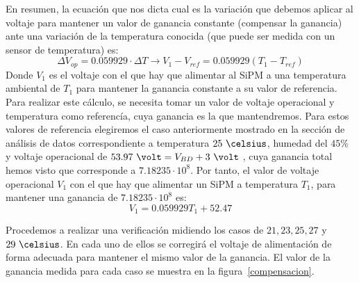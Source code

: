 En resumen, la ecuación que nos dicta cual es la variación que debemos aplicar al voltaje para mantener un valor de ganancia constante (compensar la ganancia) ante una variación de la temperatura conocida (que puede ser medida con un sensor de temperatura) es:
\begin{equation}
\Delta V_{op}=0.059929 \cdot \Delta T \longrightarrow V_1-V_{ref}=0.059929(T_1-T_{ref})
\label{compensacionfinal}
\end{equation}
Donde $V_1$ es el voltaje con el que hay que alimentar al SiPM a una temperatura ambiental de $T_1$ para mantener la ganancia constante a su valor de referencia. Para realizar este cálculo, se necesita tomar un valor de voltaje operacional y temperatura como referencía, cuya ganancia es la que mantendremos. Para estos valores de referencia elegiremos el caso anteriormente mostrado en la sección de análisis de datos correspondiente a temperatura $25~\celsius$, humedad del $45\% $ y voltaje operacional de $53.97~\volt = V_{BD}+ 3~\volt$ , cuya ganancia total hemos visto que corresponde a $7.18235 \cdot 10^8$. Por tanto, el valor de voltaje operacional $V_1$ con el que hay que alimentar un SiPM a temperatura $T_1$, para mantener una ganancia de $7.18235 \cdot 10^8$ es:
\begin{equation}
V_1=0.059929T_1+52.47
\label{compensacionfinal}
\end{equation}




Procedemos a realizar una verificación midiendo los casos de $21, 23, 25, 27$ y  $29~\celsius$. En cada uno de ellos se corregirá el voltaje de alimentación de forma adecuada para mantener el mismo valor de la ganancia. El valor de la ganancia medida para cada caso se muestra en la figura~\ref{compensacion}. 

